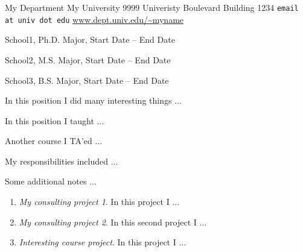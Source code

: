 \documentclass[11pt,oneside]{article}
\begin{document}
{My Department}
{My University}
{9999 Univeristy Boulevard}
{Building 1234}
{{\tt email at univ dot edu}}
{\url{www.dept.univ.edu/~myname}}


\begin{itemize*}
\item School1, Ph.D. Major, Start Date -- End Date
\item School2, M.S. Major, Start Date -- End Date
\item School3, B.S. Major, Start Date -- End Date
\end{itemize*}


{In this position I did many interesting things ...}

{In this position I taught ...}

{Another course I TA'ed ...}


{My responsibilities included ...}

{Some additional notes ...}




\begin{bibunit}[unsrt] 
\nocite{MyPaper1}
\nocite{MyPaper2}
\putbib[papers]
\end{bibunit} 



\begin{bibunit}[unsrt] 
\nocite{MyTalk1}
\nocite{MyTalk2}
\putbib[presentations]
\end{bibunit} 


\begin{enumerate}
\item \emph{My consulting project 1}.
In this project I ...

\item \emph{My consulting project 2}.
In this second project I ...

\item \emph{Interesting course project}.
In this project I ...
\end{enumerate}
\end{document}
